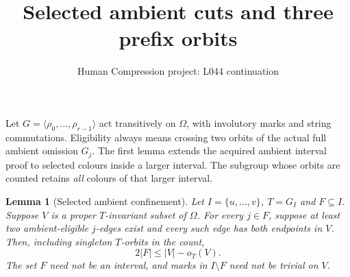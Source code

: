 \documentclass[11pt,a4paper]{article}
\title{Selected ambient cuts and three prefix orbits}
\author{Human Compression project: L044 continuation}
\date{}
\newtheorem{lemma}{Lemma}
\newcommand{\gen}[1]{\langle#1\rangle}
\begin{document}
\maketitle
Let $G=\gen{\rho_0,\ldots,\rho_{r-1}}$ act transitively on
$\Omega$, with involutory marks and string commutations. Eligibility
always means crossing two orbits of the actual full ambient omission
$G_j$. The first lemma extends the acquired ambient interval proof
to selected colours inside a larger interval. The subgroup whose
orbits are counted retains \emph{all} colours of that larger interval.

\begin{lemma}[Selected ambient confinement]\label{confine}
Let $I=\{u,\ldots,v\}$, $T=G_I$ and $F\subseteq I$.
Suppose $V$ is a proper $T$-invariant subset of $\Omega$.
For every $j\in F$, suppose at least two ambient-eligible
$j$-edges exist and every such edge has both endpoints in $V$.
Then, including singleton $T$-orbits in the count,
\[
                      2|F|\le |V|-o_T(V).                \tag{1}
\]
The set $F$ need not be an interval, and marks in $I\setminus F$
need not be trivial on $V$.
\end{lemma}
\end{document}
